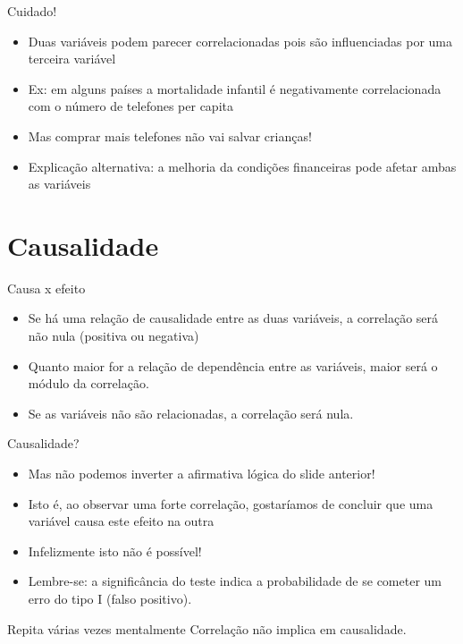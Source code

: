\documentclass{beamer}
\begin{document}
\begin{frame}{Cuidado!}
  \begin{itemize}
  \item Duas variáveis podem \alert{parecer} correlacionadas pois são
    influenciadas por uma terceira variável
  \item Ex: em alguns países a mortalidade infantil é negativamente
    correlacionada com o número de telefones per capita
  \item Mas comprar mais telefones não vai salvar crianças!
  \item Explicação alternativa: a melhoria da condições financeiras
    pode afetar ambas as variáveis
  \end{itemize}
\end{frame}

\section{Causalidade}


\begin{frame}{Causa x efeito}
  \begin{itemize}
  \item Se há uma relação de causalidade entre as duas variáveis, a
    correlação será não nula (positiva ou negativa)
  \item Quanto maior for a relação de dependência entre as variáveis,
    maior será o módulo da correlação.
  \item Se as variáveis não são relacionadas, a correlação será nula.
  \end{itemize}
\end{frame}

\begin{frame}{Causalidade?}
  \begin{itemize}
  \item Mas não podemos inverter a afirmativa lógica do slide
    anterior!
  \item Isto é, ao observar uma forte correlação, gostaríamos de
    concluir que uma variável \alert{causa} este efeito na outra
  \item Infelizmente isto não é possível!
  \item Lembre-se: a significância do teste indica a probabilidade de
    se cometer um erro do tipo I (falso positivo).
  \end{itemize}
  \begin{block}{Repita várias vezes mentalmente}
    Correlação não implica em causalidade.
  \end{block}
\end{frame}
\end{document}
